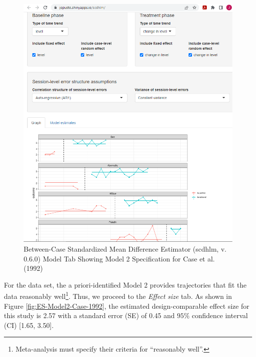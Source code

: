 \documentclass[
]{book}
\begin{document}
\begin{figure}
\includegraphics[width=0.5\linewidth]{images/app.model.model2_Case1992} \caption{Between-Case Standardized Mean Difference Estimator (scdhlm, v. 0.6.0) Model Tab Showing Model 2 Specification for Case et al. (1992)}\label{fig:Model2-Case-1992}
\end{figure}

For the \citet{case1992Improving} data set, the a priori-identified Model 2 provides trajectories that fit the data reasonably well\footnote{Meta-analysis must specify their criteria for ``reasonably well''.}. Thus, we proceed to the \emph{Effect size} tab. As shown in Figure \ref{fig:ES-Model2-Case-1992}, the estimated design-comparable effect size for this study is 2.57 with a standard error (SE) of 0.45 and \(95\%\) confidence interval (CI) {[}1.65, 3.50{]}.
\end{document}
